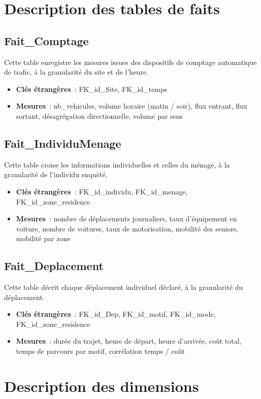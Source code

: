 \section{Description des tables de faits}

\subsection{Fait\_Comptage}
Cette table enregistre les mesures issues des dispositifs de comptage automatique de trafic, à la granularité du site et de l'heure.
\begin{itemize}
\item \textbf{Clés étrangères}~: FK\_id\_Site, FK\_id\_temps
\item \textbf{Mesures}~: nb\_vehicules, volume horaire (matin / soir), flux entrant, flux sortant, désagrégation directionnelle, volume par sens
\end{itemize}

\subsection{Fait\_IndividuMenage}
Cette table croise les informations individuelles et celles du ménage, à la granularité de l'individu enquêté.
\begin{itemize}
\item \textbf{Clés étrangères}~: FK\_id\_individu, FK\_id\_menage, FK\_id\_zone\_residence
\item \textbf{Mesures}~: nombre de déplacements journaliers, taux d'équipement en voiture, nombre de voitures, taux de motorisation, mobilité des seniors, mobilité par zone
\end{itemize}

\subsection{Fait\_Deplacement}
Cette table décrit chaque déplacement individuel déclaré, à la granularité du déplacement.
\begin{itemize}
\item \textbf{Clés étrangères}~: FK\_id\_Dep, FK\_id\_motif, FK\_id\_mode, FK\_id\_zone\_residence
\item \textbf{Mesures}~: durée du trajet, heure de départ, heure d'arrivée, coût total, temps de parcours par motif, corrélation temps / coût
\end{itemize}

\section{Description des dimensions}

